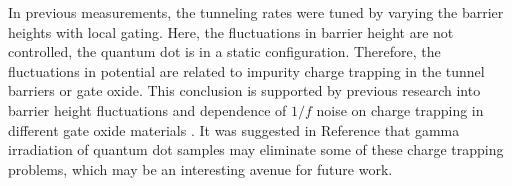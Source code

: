 In previous measurements, the tunneling rates were tuned by varying the barrier heights with local gating. Here, the fluctuations in barrier height are not controlled, the quantum dot is in a static configuration. Therefore, the fluctuations in potential are related to impurity charge trapping in the tunnel barriers or gate oxide. This conclusion is supported by previous research into barrier height fluctuations \cite{Jung2004} and dependence of $1/f$ noise on charge trapping in different gate oxide materials \cite{Sydoruk2014}. It was suggested in Reference \cite{Sydoruk2014} that gamma irradiation of quantum dot samples may eliminate some of these charge trapping problems, which may be an interesting avenue for future work.



%
%
%
%
%
%
